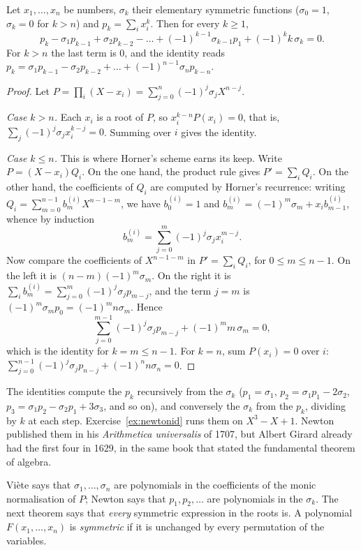 \begin{proposition}\label{prop:newtonid}
Let $x_1,\dots,x_n$ be numbers, $\sigma_k$ their elementary symmetric functions ($\sigma_0=1$, $\sigma_k=0$ for $k>n$) and $p_k=\sum_ix_i^k$.
Then for every $k\ge1$,
\[
p_k-\sigma_1p_{k-1}+\sigma_2p_{k-2}-\dots+(-1)^{k-1}\sigma_{k-1}p_1+(-1)^kk\,\sigma_k=0.
\]
For $k>n$ the last term is $0$, and the identity reads $p_k=\sigma_1p_{k-1}-\sigma_2p_{k-2}+\dots+(-1)^{n-1}\sigma_np_{k-n}$.
\end{proposition}
\begin{proof}
Let $P=\prod_i(X-x_i)=\sum_{j=0}^n(-1)^j\sigma_jX^{n-j}$.

\emph{Case $k>n$.} Each $x_i$ is a root of $P$, so $x_i^{k-n}P(x_i)=0$, that is, $\sum_j(-1)^j\sigma_jx_i^{k-j}=0$. Summing over $i$ gives the identity.

\emph{Case $k\le n$.} This is where Horner's scheme earns its keep. Write $P=(X-x_i)Q_i$. On the one hand, the product rule gives
$P'=\sum_iQ_i$. On the other hand, the coefficients of $Q_i$ are computed by Horner's recurrence: writing $Q_i=\sum_{m=0}^{n-1}b_m^{(i)}X^{n-1-m}$,
we have $b_0^{(i)}=1$ and $b_m^{(i)}=(-1)^m\sigma_m+x_ib_{m-1}^{(i)}$, whence by induction
\[
b_m^{(i)}=\sum_{j=0}^m(-1)^j\sigma_jx_i^{m-j}.
\]
Now compare the coefficients of $X^{n-1-m}$ in $P'=\sum_iQ_i$, for $0\le m\le n-1$. On the left it is $(n-m)(-1)^m\sigma_m$. On the right it is
$\sum_ib_m^{(i)}=\sum_{j=0}^m(-1)^j\sigma_jp_{m-j}$, and the term $j=m$ is $(-1)^m\sigma_mp_0=(-1)^mn\sigma_m$. Hence
\[
\sum_{j=0}^{m-1}(-1)^j\sigma_jp_{m-j}+(-1)^mm\,\sigma_m=0,
\]
which is the identity for $k=m\le n-1$. For $k=n$, sum $P(x_i)=0$ over $i$: $\sum_{j=0}^{n-1}(-1)^j\sigma_jp_{n-j}+(-1)^nn\sigma_n=0$.
\end{proof}

The identities compute the $p_k$ recursively from the $\sigma_k$ ($p_1=\sigma_1$, $p_2=\sigma_1p_1-2\sigma_2$, $p_3=\sigma_1p_2-\sigma_2p_1+3\sigma_3$,
and so on), and conversely the $\sigma_k$ from the $p_k$, dividing by $k$ at each step. Exercise~\ref{ex:newtonid} runs them on $X^3-X+1$. Newton
published them in his \emph{Arithmetica universalis} of 1707, but Albert Girard already had the first four in 1629, in the same book that stated the
fundamental theorem of algebra.

Vi\`ete says that $\sigma_1,\dots,\sigma_n$ are polynomials in the coefficients of the monic normalisation of $P$; Newton says that $p_1,p_2,\dots$ are polynomials in the $\sigma_k$.
The next theorem says that \emph{every} symmetric expression in the roots is. A polynomial $F(x_1,\dots,x_n)$ is \emph{symmetric} if it is unchanged by
every permutation of the variables.

